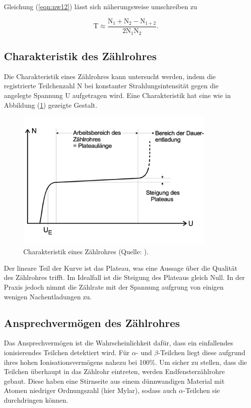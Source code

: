 \noindent
Gleichung (\ref{eqn:nw12}) lässt sich näherungsweise umschreiben zu

\begin{equation}
\text{T} \approx \frac{\text{N}_1 + \text{N}_2 - \text{N}_{1+2}}{2\text{N}_1\text{N}_2}.
\label{eqn:t}
\end{equation}


\subsection{Charakteristik des Zählrohres}
Die Charakteristik eines Zählrohres kann untersucht werden, 
indem die registrierte Teilchenzahl N bei konstanter Strahlungsintensität gegen die angelegte Spannung U aufgetragen wird.
Eine Charakteristik hat eine wie in Abbildung (\ref{fig:char}) gezeigte Gestalt.

\begin{figure}
            \centering
               \includegraphics[height=7cm]{char.pdf}
               \caption{Charakteristik eines Zählrohres (Quelle: \cite{V703}).}
               \label{fig:char}
        \end{figure}

\noindent
Der lineare Teil der Kurve ist das Plateau, was eine Aussage über die Qualität des Zählrohres trifft.
Im Idealfall ist die Steigung des Plateaus gleich Null.
In der Praxis jedoch nimmt die Zählrate mit der Spannung aufgrung von einigen wenigen Nachentladungen zu.

\subsection{Ansprechvermögen des Zählrohres}
Das Ansprechvermögen ist die Wahrscheinlichkeit dafür, dass ein einfallendes ionisierendes Teilchen detektiert wird.
Für $\alpha$- und $\beta$-Teilchen liegt diese aufgrund ihres hohen Ionisationsvermögens nahezu bei 100$\%$.
Um sicher zu stellen, dass die Teilchen überhaupt in das Zählrohr eintreten, werden Endfensterzählrohre gebaut.
Diese haben eine Stirnseite aus einem dünnwandigen Material mit Atomen niedriger Ordnungszahl (hier Mylar), 
sodass auch $\alpha$-Teilchen sie durchdringen können.


